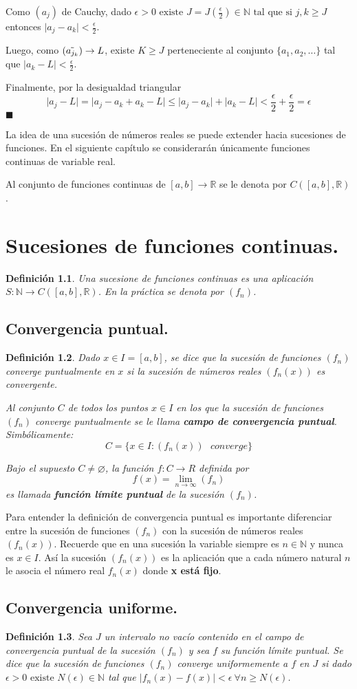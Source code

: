 \documentclass[12pt]{book}
\newcommand\R{{\mathbb R}}
\newcommand\N{{\mathbb N}}
\providecommand{\abs}[1]{\lvert#1\rvert}
\newtheorem{defi}{Definición}[section]
\begin{document}
Como $(a_j)$ de Cauchy, dado $\epsilon>0 \mbox{ existe } J=J(\frac{\epsilon}{2}) \in \N \mbox{ tal que si } j,k \ge J$ entonces $\abs{a_j-a_k}<\frac{\epsilon}{2}$.

Luego, como $(\Tilde{a_{j_k}}) \rightarrow L$, existe $K \ge J$ perteneciente al conjunto $\{ a_1,a_2,\dots \}$ tal que $\abs{a_k-L}<\frac{\epsilon}{2}$.

Finalmente, por la desigualdad triangular $$\abs{a_j-L}=\abs{a_j-a_k+a_k-L} \le \abs{a_j-a_k}+\abs{a_k-L} <\frac{\epsilon}{2} + \frac{\epsilon}{2} =\epsilon $$
$\blacksquare$

\clearpage
La idea de una sucesión de números reales se puede extender hacia sucesiones de funciones. En el siguiente capítulo se considerarán únicamente funciones continuas de variable real.

Al conjunto de funciones continuas de $[a,b] \rightarrow \R$ se le denota por $C([a,b],\R)$.
\chapter{Sucesiones de funciones continuas.}
\begin{defi}\rm
Una sucesione de funciones continuas es una aplicación $S:\N \rightarrow C([a,b],\R)$. En la práctica se denota por $(f_n)$.
\end{defi}
\section{Convergencia puntual.}
\begin{defi}\rm
Dado $x \in I=[a,b]$, se dice que la sucesión de funciones $(f_n)$ converge puntualmente en $x$ si la sucesión de números reales $(f_n(x))$ es convergente.

Al conjunto $C$ de todos los puntos $x \in I$ en los que la sucesión de funciones $(f_n)$ converge puntualmente se le llama \textbf{campo de convergencia puntual}. Simbólicamente: $$C=\{ x \in I : (f_n(x))\mbox{  }converge \}$$

Bajo el supuesto $C \neq \varnothing$, la función $f:C \rightarrow R$ definida por $$f(x)= \lim\limits_{n\to\infty}(f_n)$$ es llamada \textbf{función límite puntual} de la sucesión $(f_n)$.
\end{defi}

Para entender la definición de convergencia puntual es importante diferenciar entre la sucesión de funciones $(f_n)$ con la sucesión de números reales $(f_n(x))$. Recuerde que en una sucesión la variable siempre es $n \in \N$ y nunca es $x \in I$. Así la sucesión $(f_n(x))$ es la aplicación que a cada número natural $n$ le asocia el número real $f_n(x)$ donde \textbf{x está fijo}.
\section{Convergencia uniforme.}
\begin{defi}\rm
Sea $J$ un intervalo no vacío contenido en el campo de convergencia puntual de la sucesión $(f_n)$ y sea $f$ su función límite puntual. Se dice que la sucesión de funciones $(f_n)$ converge uniformemente a $f$ en $J$ si dado $\epsilon>0 \mbox{ existe } N(\epsilon) \in \N$ tal que $\abs{f_n(x)-f(x)}<\epsilon \ \forall{n \ge N(\epsilon)}$. 
\end{defi}
\end{document}
